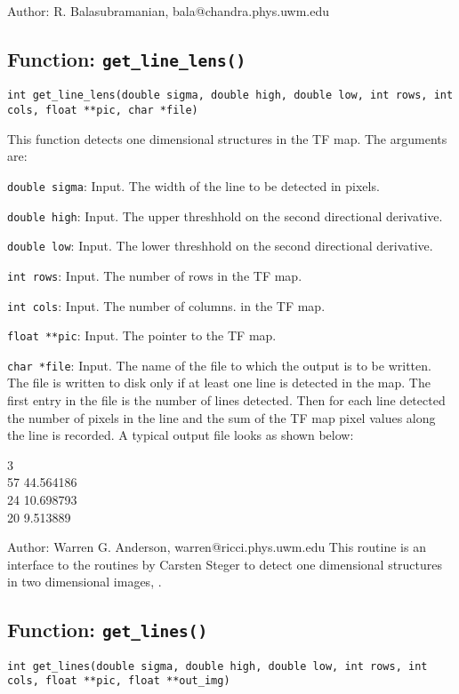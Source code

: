 \noindent Author: R. Balasubramanian, bala@chandra.phys.uwm.edu
\newpage

\subsection{Function: {\tt get\_line\_lens()}}
\label{ss:getlinelensfunc}
{\tt int get\_line\_lens(double sigma, double high, double low, int rows,
int cols, float **pic, char *file)}

This function detects one dimensional structures in the TF map. The
arguments are:
\begin{description}
\item{\tt double sigma}: Input. The width of the line to be
detected in pixels.
\item{\tt double high}: Input. The upper threshhold on the second
directional derivative.
\item{\tt double low}: Input. The lower threshhold on the second
directional derivative.
\item{\tt int rows}: Input. The number of rows in the TF map.
\item{\tt int cols}: Input. The number of columns. in the TF map.
\item {\tt float **pic}: Input. The pointer to the TF map.
\item {\tt char *file}: Input. The name of the file to which the
output is to be written. The file is written to disk only if at least one line is
detected in the map. The first entry in the file is the number of
lines detected. Then for each line detected the number of pixels in
the line and the sum of the TF map pixel values  along the line is recorded. 
A typical output file looks as shown below:

3\\
57 44.564186\\
24 10.698793\\
20 9.513889\\
\end{description}

\noindent Author: Warren G. Anderson, warren@ricci.phys.uwm.edu
This routine is an interface to the routines by Carsten Steger to
detect one dimensional structures in two dimensional images,
\cite{Stegerscode,Stegerspap}.

\subsection{Function: {\tt get\_lines()}}
{\tt int get\_lines(double sigma, double high, double low, int rows,
int cols, float **pic, float **out\_img)}

